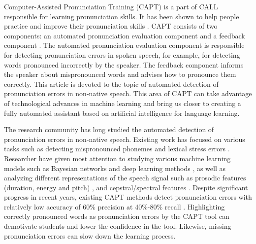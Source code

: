 \documentclass[]{interact}
\theoremstyle{plain}%
\theoremstyle{definition}
\theoremstyle{remark}
\begin{document}
Computer-Assisted Pronunciation Training (CAPT) is a part of CALL responsible for learning pronunciation skills. It has been shown to help people practice and improve their pronunciation skills \cite{neri2008effectiveness,golonka2014technologies, tejedor2020assessing}. CAPT consists of two components: an automated pronunciation evaluation component \cite{leung2019cnn,zhang2021text,korzekwa2021mispronunciation} and a feedback component \cite{ai2015automatic}. The automated pronunciation evaluation component is responsible for detecting pronunciation errors in spoken speech, for example, for detecting words pronounced incorrectly by the speaker. The feedback component informs the speaker about mispronounced words and advises  how to pronounce them correctly. This article is devoted to the topic of automated detection of pronunciation errors in non-native speech. This area of CAPT can take advantage of technological advances in machine learning and bring us closer to creating a fully automated assistant based on artificial intelligence for language learning.

The research community has long studied the automated detection of pronunciation errors in non-native speech. Existing work has focused on various tasks such as detecting mispronounced phonemes \cite{leung2019cnn} and lexical stress errors \cite{ferrer2015classification}. Researcher have given most attention to studying various machine learning models such as Bayesian networks \cite{witt2000phone, Hongyan2011} and deep learning methods \cite{leung2019cnn, zhang2021text}, as well as analyzing different representations of the speech signal such as prosodic features (duration, energy and pitch) \cite{chen2010automatic_2}, and cepstral/spectral features \cite{ferrer2015classification, shahin2016automatic, leung2019cnn}. Despite significant progress in recent years, existing CAPT methods detect pronunciation errors with relatively low accuracy of 60\% precision at 40\%-80\% recall \cite{leung2019cnn,korzekwa2021mispronunciation,zhang2021text}.  Highlighting correctly pronounced words as pronunciation errors by the CAPT tool can demotivate students and lower the confidence in the tool. Likewise, missing pronunciation errors can slow down the learning process.
\end{document}
